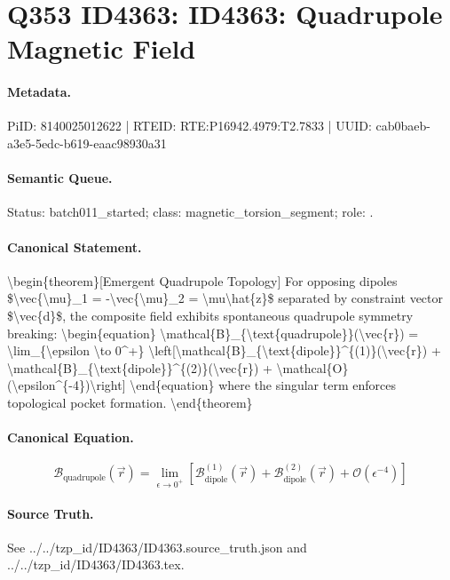 \section*{Q353 ID4363: ID4363: Quadrupole Magnetic Field}
\paragraph{Metadata.}
PiID: 8140025012622 | RTEID: RTE:P16942.4979:T2.7833 | UUID: cab0baeb-a3e5-5edc-b619-eaac98930a31

\paragraph{Semantic Queue.}
Status: batch011\_started; class: magnetic\_torsion\_segment; role: .

\paragraph{Canonical Statement.}
\textbackslash{}begin\{theorem\}[Emergent Quadrupole Topology] For opposing dipoles \$\textbackslash{}vec\{\textbackslash{}mu\}\_1 = -\textbackslash{}vec\{\textbackslash{}mu\}\_2 = \textbackslash{}mu\textbackslash{}hat\{z\}\$ separated by constraint vector \$\textbackslash{}vec\{d\}\$, the composite field exhibits spontaneous quadrupole symmetry breaking: \textbackslash{}begin\{equation\} \textbackslash{}mathcal\{B\}\_\{\textbackslash{}text\{quadrupole\}\}(\textbackslash{}vec\{r\}) = \textbackslash{}lim\_\{\textbackslash{}epsilon \textbackslash{}to 0\textasciicircum{}+\} \textbackslash{}left[\textbackslash{}mathcal\{B\}\_\{\textbackslash{}text\{dipole\}\}\textasciicircum{}\{(1)\}(\textbackslash{}vec\{r\}) + \textbackslash{}mathcal\{B\}\_\{\textbackslash{}text\{dipole\}\}\textasciicircum{}\{(2)\}(\textbackslash{}vec\{r\}) + \textbackslash{}mathcal\{O\}(\textbackslash{}epsilon\textasciicircum{}\{-4\})\textbackslash{}right] \textbackslash{}end\{equation\} where the singular term enforces topological pocket formation. \textbackslash{}end\{theorem\}

\paragraph{Canonical Equation.}
\[
\begin{equation} \mathcal{B}_{\text{quadrupole}}(\vec{r}) = \lim_{\epsilon \to 0^+} \left[\mathcal{B}_{\text{dipole}}^{(1)}(\vec{r}) + \mathcal{B}_{\text{dipole}}^{(2)}(\vec{r}) + \mathcal{O}(\epsilon^{-4})\right] \end{equation}
\]

\paragraph{Source Truth.}
See ../../tzp\_id/ID4363/ID4363.source\_truth.json and ../../tzp\_id/ID4363/ID4363.tex.
